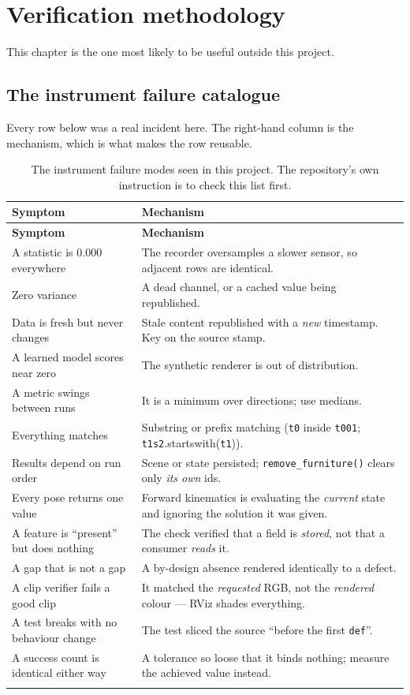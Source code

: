 \documentclass[11pt,a4paper,oneside]{report}
\newcommand{\code}[1]{\texttt{\small #1}}
\begin{document}
\chapter{Verification methodology}

This chapter is the one most likely to be useful outside this project.

\section{The instrument failure catalogue}

Every row below was a real incident here. The right-hand column is the
mechanism, which is what makes the row reusable.

\begin{longtable}{@{}p{}p{}@{}}
\toprule
\textbf{Symptom} & \textbf{Mechanism} \\
\midrule
\endfirsthead
\toprule
\textbf{Symptom} & \textbf{Mechanism} \\
\midrule
\endhead
A statistic is 0.000 everywhere & The recorder oversamples a slower sensor, so
adjacent rows are identical. \\
Zero variance & A dead channel, or a cached value being republished. \\
Data is fresh but never changes & Stale content republished with a \emph{new}
timestamp. Key on the source stamp. \\
A learned model scores near zero & The synthetic renderer is out of
distribution. \\
A metric swings between runs & It is a minimum over directions; use medians. \\
Everything matches & Substring or prefix matching (\code{t0} inside
\code{t001}; \code{t1s2}.startswith(\code{t1})). \\
Results depend on run order & Scene or state persisted;
\code{remove\_furniture()} clears only \emph{its own} ids. \\
Every pose returns one value & Forward kinematics is evaluating the
\emph{current} state and ignoring the solution it was given. \\
A feature is ``present'' but does nothing & The check verified that a field is
\emph{stored}, not that a consumer \emph{reads} it. \\
A gap that is not a gap & A by-design absence rendered identically to a defect.
\\
A clip verifier fails a good clip & It matched the \emph{requested} RGB, not the
\emph{rendered} colour --- RViz shades everything. \\
A test breaks with no behaviour change & The test sliced the source ``before the
first \code{def}''. \\
A success count is identical either way & A tolerance so loose that it binds
nothing; measure the achieved value instead. \\
\bottomrule
\caption{The instrument failure modes seen in this project. The repository's
own instruction is to check this list first.}
\end{longtable}
\end{document}
